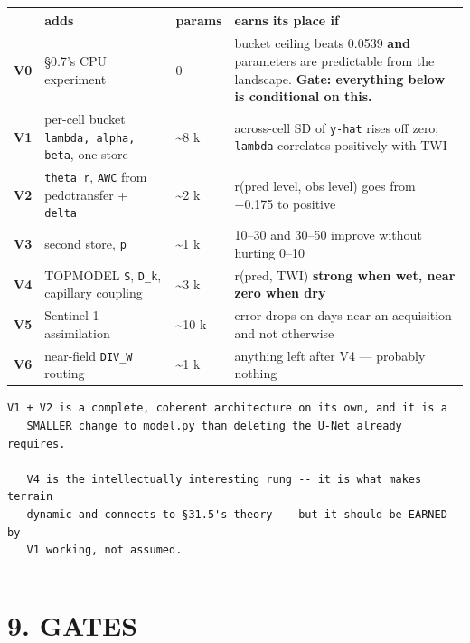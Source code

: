\documentclass[10pt,a4paper]{article}
\begin{document}
\begin{center}
\small
\begin{tabularx}{\linewidth}{XXXX}
\toprule
\textbf{} & \textbf{adds} & \textbf{params} & \textbf{earns its place if} \\
\midrule
\textbf{V0} & §0.7's CPU experiment & 0 & bucket ceiling beats 0.0539 \textbf{and} parameters are predictable from the landscape. \textbf{Gate: everything below is conditional on this.} \\
\textbf{V1} & per-cell bucket \texttt{lambda, alpha, beta}, one store & \textasciitilde{}8 k & across-cell SD of \texttt{y-hat} rises off zero; \texttt{lambda} correlates positively with TWI \\
\textbf{V2} & \texttt{theta\_r}, \texttt{AWC} from pedotransfer + \texttt{delta} & \textasciitilde{}2 k & r(pred level, obs level) goes from −0.175 to positive \\
\textbf{V3} & second store, \texttt{p} & \textasciitilde{}1 k & 10–30 and 30–50 improve without hurting 0–10 \\
\textbf{V4} & TOPMODEL \texttt{S}, \texttt{D\_k}, capillary coupling & \textasciitilde{}3 k & r(pred, TWI) \textbf{strong when wet, near zero when dry} \\
\textbf{V5} & Sentinel-1 assimilation & \textasciitilde{}10 k & error drops on days near an acquisition and not otherwise \\
\textbf{V6} & near-field \texttt{DIV\_W} routing & \textasciitilde{}1 k & anything left after V4 — probably nothing \\
\bottomrule
\end{tabularx}
\end{center}

\begin{Verbatim}[fontsize=\scriptsize,frame=leftline,framerule=0.6pt,rulecolor=\color{rulegray},xleftmargin=6pt,framesep=6pt,]
   V1 + V2 is a complete, coherent architecture on its own, and it is a
   SMALLER change to model.py than deleting the U-Net already requires.

   V4 is the intellectually interesting rung -- it is what makes terrain
   dynamic and connects to §31.5's theory -- but it should be EARNED by
   V1 working, not assumed.
\end{Verbatim}

\medskip\hrule\medskip

\section*{9. GATES}
\end{document}
